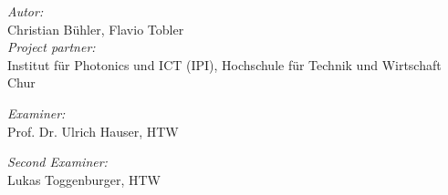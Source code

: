 \begin{titlepage}
\begin{center}
{\normalsize

\textit{Autor:}\\
Christian Bühler, Flavio Tobler\\[35mm]



\textit{Project partner:}\\
Institut für Photonics und ICT (IPI), Hochschule für Technik und Wirtschaft Chur

\textit{Examiner:}\\
Prof. Dr. Ulrich Hauser, HTW

\textit{Second Examiner:}\\
Lukas Toggenburger, HTW

}
\end{center}
\end{titlepage}

\restoregeometry %

